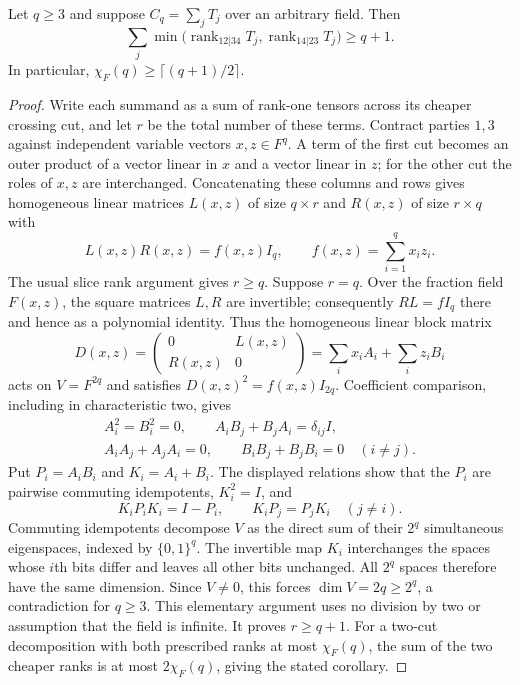 \begin{proposition}
\label{pg:slice-clifford}
Let $q\geq3$ and suppose $C_q=\sum_jT_j$ over an arbitrary field.
Then
\[
 \sum_j\min\bigl(\operatorname{rank}_{12|34}T_j,
                   \operatorname{rank}_{14|23}T_j\bigr)\geq q+1.
 \tag{PG-SLICE-strict}
\]
In particular, $\chi_F(q)\geq\lceil(q+1)/2\rceil$.
\end{proposition}
\begin{proof}
Write each summand as a sum of rank-one tensors across its
cheaper crossing cut, and let $r$ be the total number of these
terms. Contract parties $1,3$ against independent variable vectors
$x,z\in F^q$. A term of the first cut becomes an outer product
of a vector linear in $x$ and a vector linear in $z$; for the
other cut the roles of $x,z$ are interchanged. Concatenating
these columns and rows gives homogeneous linear matrices
$L(x,z)$ of size $q\times r$ and $R(x,z)$ of size $r\times q$
with
\[
 L(x,z)R(x,z)=f(x,z)I_q,
 \qquad f(x,z)=\sum_{i=1}^q x_i z_i.
\]
The usual slice rank argument gives $r\geq q$. Suppose $r=q$.
Over the fraction field $F(x,z)$, the square matrices $L,R$ are
invertible; consequently $RL=fI_q$ there and hence as a
polynomial identity. Thus the homogeneous linear block matrix
\[
 D(x,z)=\begin{pmatrix}0&L(x,z)\\R(x,z)&0\end{pmatrix}
       =\sum_i x_iA_i+\sum_i z_iB_i
\]
acts on $V=F^{2q}$ and satisfies $D(x,z)^2=f(x,z)I_{2q}$.
Coefficient comparison, including in characteristic two, gives
\[
 \begin{gathered}
 A_i^2=B_i^2=0,\qquad
 A_iB_j+B_jA_i=\delta_{ij}I,\\
 A_iA_j+A_jA_i=0,
 \qquad B_iB_j+B_jB_i=0\quad(i\ne j).
 \end{gathered}
\]
Put $P_i=A_iB_i$ and $K_i=A_i+B_i$. The displayed relations
show that the $P_i$ are pairwise commuting idempotents,
$K_i^2=I$, and
\[
 K_iP_iK_i=I-P_i,
 \qquad K_iP_j=P_jK_i\quad(j\ne i).
\]
Commuting idempotents decompose $V$ as the direct sum of their
$2^q$ simultaneous eigenspaces, indexed by $\{0,1\}^q$.
The invertible map $K_i$ interchanges the spaces whose $i$th bits
differ and leaves all other bits unchanged. All $2^q$ spaces
therefore have the same dimension. Since $V\ne0$, this forces
$\dim V=2q\geq2^q$, a contradiction for $q\geq3$.
This elementary argument uses no division by two or assumption
that the field is infinite. It proves $r\geq q+1$.
For a two-cut decomposition with both prescribed ranks at most
$\chi_F(q)$, the sum of the two cheaper ranks is at most
$2\chi_F(q)$, giving the stated corollary.
\end{proof}

